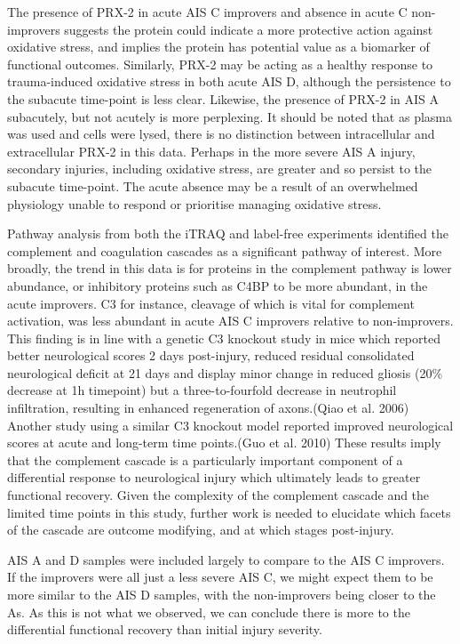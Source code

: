 \documentclass[
]{article}
\begin{document}
\begin{landscape}
\begin{landscape}
The presence of PRX-2 in acute AIS C improvers and absence in acute C non-improvers suggests the protein could indicate a more protective action against oxidative stress, and implies the protein has potential value as a biomarker of functional outcomes.
Similarly, PRX-2 may be acting as a healthy response to trauma-induced oxidative stress in both acute AIS D, although the persistence to the subacute time-point is less clear.
Likewise, the presence of PRX-2 in AIS A subacutely, but not acutely is more perplexing.
It should be noted that as plasma was used and cells were lysed, there is no distinction between intracellular and extracellular PRX-2 in this data.
Perhaps in the more severe AIS A injury, secondary injuries, including oxidative stress, are greater and so persist to the subacute time-point.
The acute absence may be a result of an overwhelmed physiology unable to respond or prioritise managing oxidative stress.

Pathway analysis from both the iTRAQ and label-free experiments identified the complement and coagulation cascades as a significant pathway of interest.
More broadly, the trend in this data is for proteins in the complement pathway is lower abundance, or inhibitory proteins such as C4BP to be more abundant, in the acute improvers.
C3 for instance, cleavage of which is vital for complement activation, was less abundant in acute AIS C improvers relative to non-improvers.
This finding is in line with a genetic C3 knockout study in mice which reported better neurological scores 2 days post-injury, reduced residual consolidated neurological deficit at 21 days and display minor change in reduced gliosis (20\% decrease at 1h timepoint) but a three-to-fourfold decrease in neutrophil infiltration, resulting in enhanced regeneration of axons.(Qiao et al. 2006)
Another study using a similar C3 knockout model reported improved neurological scores at acute and long-term time points.(Guo et al. 2010)
These results imply that the complement cascade is a particularly important component of a differential response to neurological injury which ultimately leads to greater functional recovery.
Given the complexity of the complement cascade and the limited time points in this study, further work is needed to elucidate which facets of the cascade are outcome modifying, and at which stages post-injury.

AIS A and D samples were included largely to compare to the AIS C improvers.
If the improvers were all just a less severe AIS C, we might expect them to be more similar to the AIS D samples, with the non-improvers being closer to the As.
As this is not what we observed, we can conclude there is more to the differential functional recovery than initial injury severity.


\end{landscape}
\end{landscape}
\end{document}
